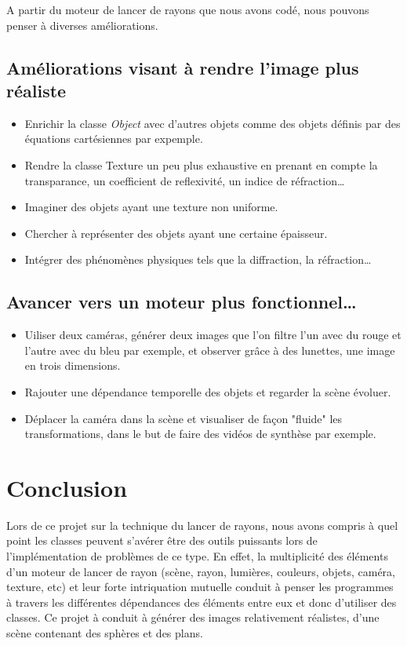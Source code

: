 \documentclass{article}
\begin{document}
A partir du moteur de lancer de rayons que nous avons codé, nous pouvons penser à diverses améliorations.
\subsection{Améliorations visant à rendre l'image plus réaliste}
	\begin{itemize}
		\item Enrichir la classe \emph{Object} avec d'autres objets comme des objets définis par des équations cartésiennes par expemple.
		\item Rendre la classe Texture un peu plus exhaustive en prenant en compte la transparance, un coefficient de reflexivité, un indice de réfraction\dots
		\item Imaginer des objets ayant une texture non uniforme.
		\item Chercher à représenter des objets ayant une certaine épaisseur.
		\item Intégrer des phénomènes physiques tels que la diffraction, la réfraction\dots
	\end{itemize}

\subsection{Avancer vers un moteur plus fonctionnel\dots}
	\begin{itemize}
		\item Uiliser deux caméras, générer deux images que l'on filtre l'un avec du rouge et l'autre avec du bleu par exemple, et observer grâce à des lunettes, une image en trois dimensions.
		\item Rajouter une dépendance temporelle des objets et regarder la scène évoluer.
		\item Déplacer la caméra dans la scène et visualiser de façon "fluide" les transformations, dans le but de faire des vidéos de synthèse par exemple.
	\end{itemize}

\section{Conclusion}
Lors de ce projet sur la technique du lancer de rayons, nous avons compris à quel point les classes peuvent s'avérer être des outils puissants lors de l'implémentation de problèmes de ce type. En effet, la multiplicité des éléments d'un moteur de lancer de rayon (scène, rayon, lumières, couleurs, objets, caméra, texture, etc) et leur forte intriquation mutuelle conduit à penser les programmes à travers les différentes dépendances des éléments entre eux et donc d'utiliser des classes. Ce projet à conduit à générer des images relativement réalistes, d'une scène contenant des sphères et des plans.
\end{document}
